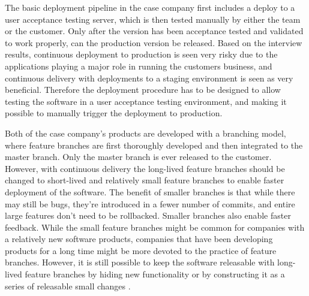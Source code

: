 \documentclass[english]{tktltiki2}
\theoremstyle{definition}
\theoremstyle{remark}
\begin{document}
The basic deployment pipeline in the case company first includes a deploy to a user acceptance testing server, which is then tested manually by either the team or the customer. Only after the version has been acceptance tested and validated to work properly, can the production version be released. Based on the interview results, continuous deployment to production is seen very risky due to the applications playing a major role in running the customers business, and continuous delivery with deployments to a staging environment is seen as very beneficial. Therefore the deployment procedure has to be designed to allow testing the software in a user acceptance testing environment, and making it possible to manually trigger the deployment to production.

Both of the case company's products are developed with a branching model, where feature branches are first thoroughly developed and then integrated to the master branch. Only the master branch is ever released to the customer. However, with continuous delivery the long-lived feature branches should be changed to short-lived and relatively small feature branches to enable faster deployment of the software. The benefit of smaller branches is that while there may still be bugs, they're introduced in a fewer number of commits, and entire large features don't need to be rollbacked. Smaller branches also enable faster feedback. While the small feature branches might be common for companies with a relatively new software products, companies that have been developing products for a long time might be more devoted to the practice of feature branches. However, it is still possible to keep the software releasable with long-lived feature branches by hiding new functionality or by constructing it as a series of releasable small changes \cite{cdbook}.
\end{document}
